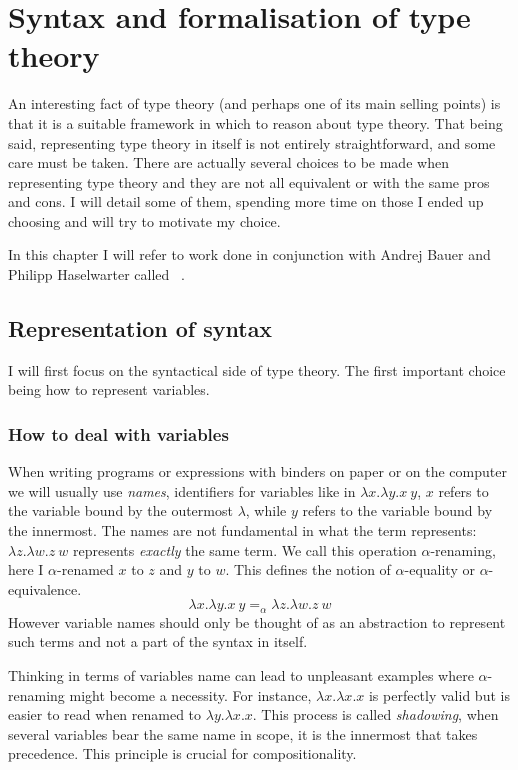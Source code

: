 \chapter{Syntax and formalisation of type theory}

An interesting fact of type theory (and perhaps one of its main selling points)
is that it is a suitable framework in which to reason about type theory.
That being said, representing type theory in itself is not entirely
straightforward, and some care must be taken. There are actually several choices
to be made when representing type theory and they are not all equivalent or with
the same pros and cons.
I will detail some of them, spending more time on those I ended up choosing
and will try to motivate my choice.

In this chapter I will refer to work done in conjunction with Andrej Bauer and
Philipp Haselwarter called \ftt~.

\section{Representation of syntax}

I will first focus on the syntactical side of type theory.
The first important choice being how to represent variables.

\subsection{How to deal with variables}

When writing programs or expressions with binders on paper or on the computer
we will usually use \emph{names}, identifiers for variables like in
\(\lambda x. \lambda y. x\ y\), \(x\) refers to the variable bound by the
outermost \(\lambda\), while \(y\) refers to the variable bound by the
innermost.
The names are not fundamental in what the term represents:
\(\lambda z. \lambda w. z\ w\) represents \emph{exactly} the same term.
We call this operation \(\alpha\)-renaming, here I \(\alpha\)-renamed \(x\)
to \(z\) and \(y\) to \(w\). This defines the notion of \(\alpha\)-equality
or \(\alpha\)-equivalence.
\[
  \lambda x. \lambda y. x\ y =_\alpha \lambda z. \lambda w. z\ w
\]
However variable names should only be thought of as an abstraction to represent
such terms and not a part of the syntax in itself.

Thinking in terms of variables name can lead to unpleasant examples where
\(\alpha\)-renaming might become a necessity.
For instance, \(\lambda x. \lambda x. x\) is perfectly valid but is easier to
read when renamed to \(\lambda y. \lambda x. x\). This process is called
\emph{shadowing}, when several variables bear the same name in scope, it is the
innermost that takes precedence. This principle is crucial for compositionality.


